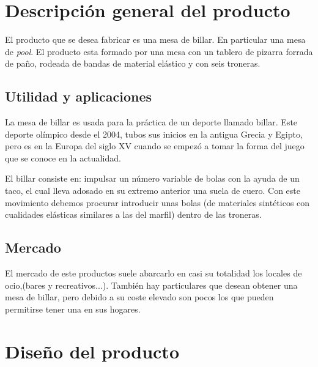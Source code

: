 \section {Descripción general del producto}
	El producto que se desea fabricar es una mesa de billar. En particular una mesa de \emph{pool}.
El producto esta formado por una  mesa con un tablero de pizarra forrada de paño, rodeada de bandas de material elástico y con seis troneras. 
	
	\subsection {Utilidad y aplicaciones}
	La mesa de billar es usada para la práctica de un deporte llamado billar. Este deporte olímpico desde el 2004, tubos sus inicios en la 
 antigua  Grecia y Egipto, pero es en la Europa del siglo XV cuando se empezó a tomar la forma del juego que se conoce en la actualidad. 

El billar consiste en: impulsar un número variable de bolas con la ayuda de un taco,  el cual lleva adosado en su extremo anterior una suela de cuero.
Con este movimiento debemos procurar introducir unas bolas (de materiales sintéticos con cualidades elásticas similares a las del marfil) dentro de las troneras.

	\subsection {Mercado}

El mercado de este productos suele abarcarlo en casi su totalidad los locales de ocio,(bares y recreativos...). También hay particulares que desean obtener una
mesa de billar, pero debido a su coste elevado son pocos los que pueden permitirse tener una en sus hogares. 
    
\section {Diseño del producto}

